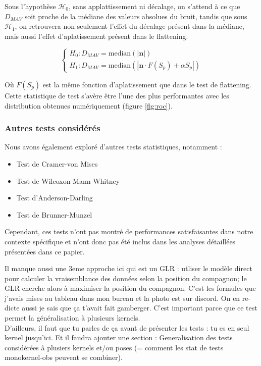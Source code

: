 \documentclass{article}
\newcommand{\dm}[1]{{\color{mulberry} #1}}
\begin{document}
Sous l'hypothèse $\mathcal{H}_0$, sans applattissement ni décalage, on s'attend à ce que $D_{MAV}$ soit proche de la médiane des valeurs absolues du bruit, tandis que sous $\mathcal{H}_1$, on retrouvera non seulement l'effet du décalage présent dans la médiane, mais aussi l'effet d'aplatissement présent dans le flattening.

$$
\begin{cases}
H_0 : D_{MAV} = \text{median}(|\mathbf{n}|)\\
H_1 : D_{MAV} = \text{median}(|\mathbf{n} \cdot F(S_p) + \alpha S_p|)
\end{cases}
$$

Où $F(S_p)$ est la même fonction d'aplatissement que dans le test de flattening. Cette statistique de test s'avère être l'une des plus performantes avec les distribution obtenues numériquement (figure \ref{fig:roc}).

\subsubsection{Autres tests considérés}\label{sec:other_tests}
Nous avons également exploré d'autres tests statistiques, notamment :
\begin{itemize}
    \item Test de Cramer-von Mises
    \item Test de Wilcoxon-Mann-Whitney
    \item Test d'Anderson-Darling
    \item Test de Brunner-Munzel
\end{itemize}

Cependant, ces tests n'ont pas montré de performances satisfaisantes dans notre contexte spécifique et n'ont donc pas été inclus dans les analyses détaillées présentées dans ce papier.



\dm{Il manque aussi une 3eme approche  ici qui est un GLR : utliser le modèle direct pour calculer la vraisemblance des données selon la position du compagnon; le GLR cherche alors à maximiser la position du compagnon. C'est les formules que j'avais mises au tableau dans mon bureau et la photo est sur discord. On en re-dicte aussi je sais que ça t'avait fait gamberger. C'est important parce que ce test permet la généralisation à plusieurs kernels. \\
D'ailleurs, il faut que tu parles de ça avant de présenter les tests : tu es en seul kernel jusqu'ici. Et il faudra ajouter  une section : Generalisation des tests considérées à plusiers kernels et/ou poses (= comment les stat de tests monokernel-obs peuvent se combiner).}
\end{document}
